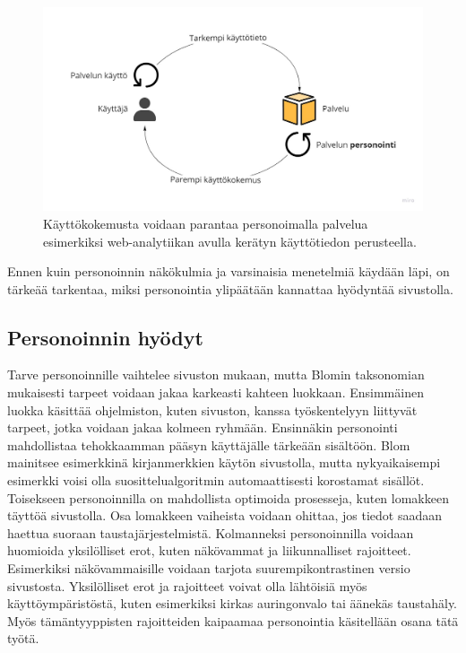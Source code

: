 \documentclass[finnish, 12pt, a4paper, elec, utf8, a-1b]{aaltothesis}
\begin{document}
\begin{figure}[h]
    \centering
    \includegraphics[width=\textwidth]{images/personalization.jpg}
    \caption{Käyttökokemusta voidaan parantaa personoimalla palvelua esimerkiksi
    web-analytiikan avulla kerätyn käyttötiedon
    perusteella.~\label{fig:personalization}}
\end{figure}

Ennen kuin personoinnin näkökulmia ja varsinaisia menetelmiä käydään läpi, on
tärkeää tarkentaa, miksi personointia ylipäätään kannattaa hyödyntää
sivustolla.

\subsection{Personoinnin hyödyt}\label{personalization-pros}

Tarve personoinnille vaihtelee sivuston mukaan, mutta Blomin taksonomian
mukaisesti tarpeet voidaan jakaa karkeasti kahteen luokkaan. Ensimmäinen luokka
käsittää ohjelmiston, kuten sivuston, kanssa työskentelyyn liittyvät tarpeet,
jotka voidaan jakaa kolmeen ryhmään. Ensinnäkin personointi mahdollistaa
tehokkaamman pääsyn käyttäjälle tärkeään sisältöön. Blom mainitsee esimerkkinä
kirjanmerkkien käytön sivustolla, mutta nykyaikaisempi esimerkki voisi olla
suosittelualgoritmin automaattisesti korostamat sisällöt. Toisekseen
personoinnilla on mahdollista optimoida prosesseja, kuten lomakkeen täyttöä
sivustolla. Osa lomakkeen vaiheista voidaan ohittaa, jos tiedot saadaan haettua
suoraan taustajärjestelmistä. Kolmanneksi personoinnilla voidaan huomioida
yksilölliset erot, kuten näkövammat ja liikunnalliset rajoitteet. Esimerkiksi
näkövammaisille voidaan tarjota suurempikontrastinen versio sivustosta.
Yksilölliset erot ja rajoitteet voivat olla lähtöisiä myös käyttöympäristöstä,
kuten esimerkiksi kirkas auringonvalo tai äänekäs taustahäly. Myös
tämäntyyppisten rajoitteiden kaipaamaa personointia käsitellään osana tätä
työtä.
\end{document}
